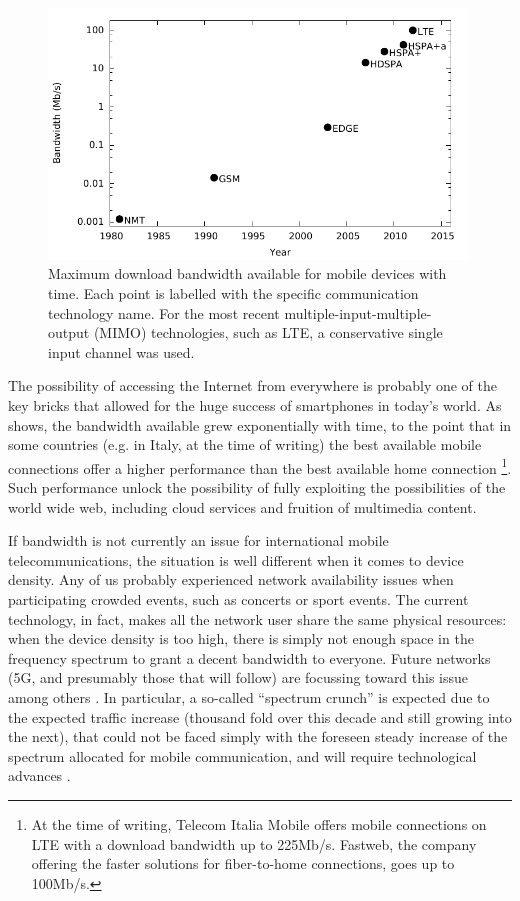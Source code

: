 \documentclass[12pt,a4paper,twoside,openright]{book}
\begin{document}
\begin{figure}
	\centering
	\includegraphics[width=0.99\textwidth]{img/charts/mobile-data-performance}
	\caption[Bandwidth of international mobile telecommunications services]{
		Maximum download bandwidth available for mobile devices with time.
		Each point is labelled with the specific communication technology name.
		For the most recent multiple-input-multiple-output (MIMO) technologies, such as LTE, a conservative single input channel was used.
	}
	\label{img:mobile-bandwidth}
\end{figure}

The possibility of accessing the Internet from everywhere is probably one of the key bricks that allowed for the huge success of smartphones in today's world.
%
As  shows, the bandwidth available grew exponentially with time, to the point that in some countries (e.g. in Italy, at the time of writing) the best available mobile connections offer a higher performance than the best available home connection
%
\footnote{At the time of writing, Telecom Italia Mobile offers mobile connections on LTE with a download bandwidth up to 225Mb/s.
%
Fastweb, the company offering the faster solutions for fiber-to-home connections, goes up to 100Mb/s.}.
%
Such performance unlock the possibility of fully exploiting the possibilities of the world wide web, including cloud services and fruition of multimedia content.

If bandwidth is not currently an issue for international mobile telecommunications, the situation is well different when it comes to device density.
%
Any of us probably experienced network availability issues when participating crowded events, such as concerts or sport events.
%
The current technology, in fact, makes all the network user share the same physical resources: when the device density is too high, there is simply not enough space in the frequency spectrum to grant a decent bandwidth to everyone.
%
Future networks (5G, and presumably those that will follow) are focussing toward this issue among others \cite{5g}.
%
In particular, a so-called ``spectrum crunch'' is expected due to the expected traffic increase (thousand fold over this decade and still growing into the next), that could not be faced simply with the foreseen steady increase of the spectrum allocated for mobile communication, and will require technological advances \cite{spectrum-crunch}.
\end{document}
